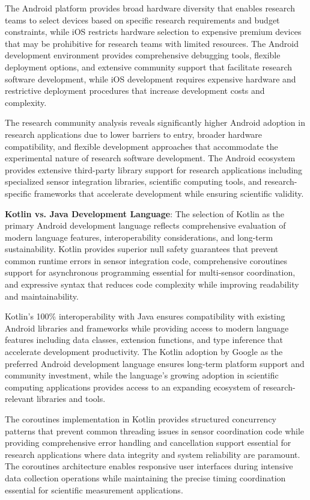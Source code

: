 \documentclass[12pt,a4paper]{article}
\begin{document}
The Android platform provides broad hardware diversity that enables research teams to select devices based on specific
research requirements and budget constraints, while iOS restricts hardware selection to expensive premium devices that
may be prohibitive for research teams with limited resources. The Android development environment provides comprehensive
debugging tools, flexible deployment options, and extensive community support that facilitate research software
development, while iOS development requires expensive hardware and restrictive deployment procedures that increase
development costs and complexity.

The research community analysis reveals significantly higher Android adoption in research applications due to lower
barriers to entry, broader hardware compatibility, and flexible development approaches that accommodate the experimental
nature of research software development. The Android ecosystem provides extensive third-party library support for
research applications including specialized sensor integration libraries, scientific computing tools, and
research-specific frameworks that accelerate development while ensuring scientific validity.

\textbf{Kotlin vs. Java Development Language}: The selection of Kotlin as the primary Android development language reflects
comprehensive evaluation of modern language features, interoperability considerations, and long-term sustainability.
Kotlin provides superior null safety guarantees that prevent common runtime errors in sensor integration code,
comprehensive coroutines support for asynchronous programming essential for multi-sensor coordination, and expressive
syntax that reduces code complexity while improving readability and maintainability.

Kotlin's 100\% interoperability with Java ensures compatibility with existing Android libraries and frameworks while
providing access to modern language features including data classes, extension functions, and type inference that
accelerate development productivity. The Kotlin adoption by Google as the preferred Android development language ensures
long-term platform support and community investment, while the language's growing adoption in scientific computing
applications provides access to an expanding ecosystem of research-relevant libraries and tools.

The coroutines implementation in Kotlin provides structured concurrency patterns that prevent common threading issues in
sensor coordination code while providing comprehensive error handling and cancellation support essential for research
applications where data integrity and system reliability are paramount. The coroutines architecture enables responsive
user interfaces during intensive data collection operations while maintaining the precise timing coordination essential
for scientific measurement applications.
\end{document}
